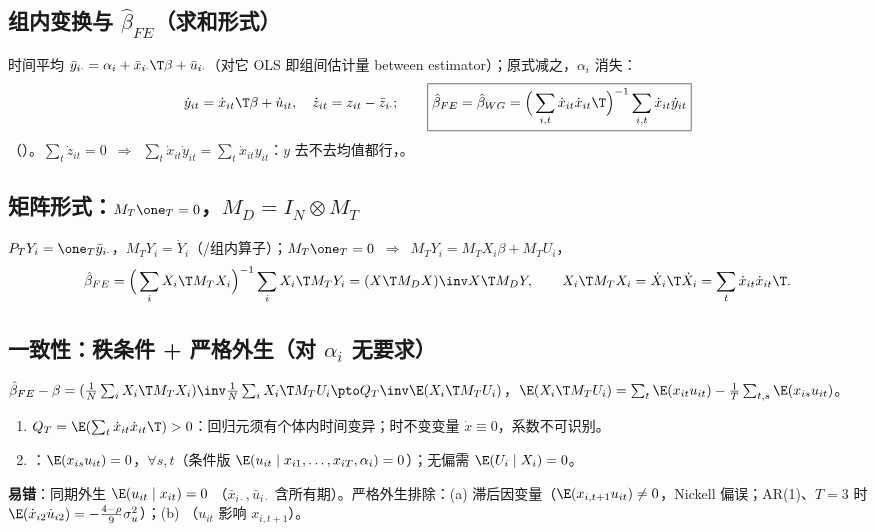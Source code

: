 \subsection{组内变换与 \texorpdfstring{$\hat\beta_{FE}$}{beta\_FE}（求和形式）}
时间平均 $\bar y_{i\cdot}=\alpha_i+\bar x_{i\cdot}\T\beta+\bar u_{i\cdot}$（对它 OLS 即组间估计量 between estimator）；原式减之，$\alpha_i$ 消失：
\begin{equation}\label{eq:QU10a-within}
\dot y_{it}=\dot x_{it}\T\beta+\dot u_{it},\quad \dot z_{it}=z_{it}-\bar z_{i\cdot};\qquad
\boxed{\hat\beta_{FE}=\hat\beta_{WG}=\Big(\sum_{i,t}\dot x_{it}\dot x_{it}\T\Big)^{-1}\sum_{i,t}\dot x_{it}\dot y_{it}}
\end{equation}
（）。$\sum_t\dot z_{it}=0$\ $\Rightarrow$\ $\sum_t\dot x_{it}\dot y_{it}=\sum_t\dot x_{it}y_{it}$：$y$ 去不去均值都行，。

\subsection{矩阵形式：\texorpdfstring{$M_T\one_T=0$}{M\_T 1 = 0}，\texorpdfstring{$M_D=I_N\otimes M_T$}{M\_D = I\_N kron M\_T}}
$P_TY_i=\one_T\bar y_{i\cdot}$，$M_TY_i=\dot Y_i$（/组内算子）；$M_T\one_T=0$\ $\Rightarrow$\ $M_TY_i=M_TX_i\beta+M_TU_i$，
\begin{equation}\label{eq:QU10a-fe-mat}
\hat\beta_{FE}=\Big(\sum_iX_i\T M_TX_i\Big)^{-1}\sum_iX_i\T M_TY_i=(X\T M_DX)\inv X\T M_DY,\qquad X_i\T M_TX_i=\dot X_i\T\dot X_i=\sum_t\dot x_{it}\dot x_{it}\T .
\end{equation}

\subsection{一致性：秩条件 + 严格外生（对 \texorpdfstring{$\alpha_i$}{alpha\_i} 无要求）}
$\hat\beta_{FE}-\beta=(\frac1N\sum_iX_i\T M_TX_i)\inv\frac1N\sum_iX_i\T M_TU_i\pto Q_T\inv\E(X_i\T M_TU_i)$，$\E(X_i\T M_TU_i)=\sum_t\E(x_{it}u_{it})-\frac1T\sum_{t,s}\E(x_{is}u_{it})$。
\begin{enumerate}[label=(\roman*)]
\item {} $Q_T=\E(\sum_t\dot x_{it}\dot x_{it}\T)>0$：回归元须有个体内时间变异；时不变变量 $\dot x\equiv0$，系数不可识别。
\item {}：$\E(x_{is}u_{it})=0$，$\forall s,t$（条件版 $\E(u_{it}\mid x_{i1},\dots,x_{iT},\alpha_i)=0$）；无偏需 $\E(U_i\mid X_i)=0$。
\end{enumerate}
\textbf{易错}：同期外生 $\E(u_{it}\mid x_{it})=0$ （$\bar x_{i\cdot},\bar u_{i\cdot}$ 含所有期）。严格外生排除：(a) 滞后因变量（$\E(x_{i,t+1}u_{it})\neq0$，Nickell 偏误；AR(1)、$T=3$ 时 $\E(\dot x_{i2}\dot u_{i2})=-\frac{4-\rho}{9}\sigma_u^2$）；(b) （$u_{it}$ 影响 $x_{i,t+1}$）。

